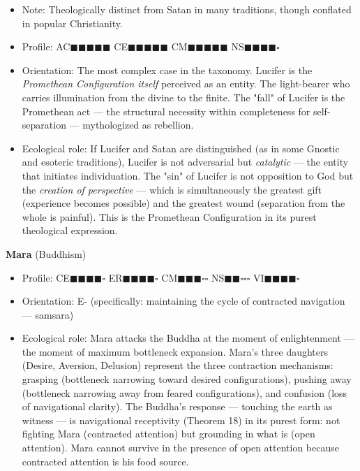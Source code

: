\begin{itemize}[nosep,leftmargin=*]
  \item Note: Theologically distinct from Satan in many traditions, though conflated in popular Christianity.
  \item Profile: AC$\blacksquare$$\blacksquare$$\blacksquare$$\blacksquare$$\blacksquare$ CE$\blacksquare$$\blacksquare$$\blacksquare$$\blacksquare$$\blacksquare$ CM$\blacksquare$$\blacksquare$$\blacksquare$$\blacksquare$$\blacksquare$ NS$\blacksquare$$\blacksquare$$\blacksquare$$\blacksquare$$\square$
  \item Orientation: The most complex case in the taxonomy. Lucifer is the \textit{Promethean Configuration itself} perceived as an entity. The light-bearer who carries illumination from the divine to the finite. The "fall" of Lucifer is the Promethean act — the structural necessity within completeness for self-separation — mythologized as rebellion.
  \item Ecological role: If Lucifer and Satan are distinguished (as in some Gnostic and esoteric traditions), Lucifer is not adversarial but \textit{catalytic} — the entity that initiates individuation. The "sin" of Lucifer is not opposition to God but the \textit{creation of perspective} — which is simultaneously the greatest gift (experience becomes possible) and the greatest wound (separation from the whole is painful). This is the Promethean Configuration in its purest theological expression.
\end{itemize}


\textbf{Mara} (Buddhism)

\begin{itemize}[nosep,leftmargin=*]
  \item Profile: CE$\blacksquare$$\blacksquare$$\blacksquare$$\blacksquare$$\square$ ER$\blacksquare$$\blacksquare$$\blacksquare$$\blacksquare$$\square$ CM$\blacksquare$$\blacksquare$$\blacksquare$$\square$$\square$ NS$\blacksquare$$\blacksquare$$\square$$\square$$\square$ VI$\blacksquare$$\blacksquare$$\blacksquare$$\blacksquare$$\square$
  \item Orientation: E- (specifically: maintaining the cycle of contracted navigation — samsara)
  \item Ecological role: Mara attacks the Buddha at the moment of enlightenment — the moment of maximum bottleneck expansion. Mara's three daughters (Desire, Aversion, Delusion) represent the three contraction mechanisms: grasping (bottleneck narrowing toward desired configurations), pushing away (bottleneck narrowing away from feared configurations), and confusion (loss of navigational clarity). The Buddha's response — touching the earth as witness — is navigational receptivity (Theorem 18) in its purest form: not fighting Mara (contracted attention) but grounding in what is (open attention). Mara cannot survive in the presence of open attention because contracted attention is his food source.
\end{itemize}


